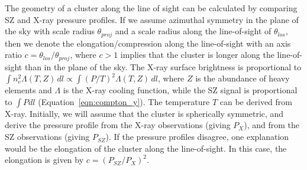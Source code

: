 \documentclass[iop,numberedappendix,apj]{emulateapj}
\begin{document}
The geometry of a cluster along the line of sight can be calculated by comparing SZ and
X-ray pressure profiles.  If we assume azimuthal symmetry in the plane of the sky with scale radius $\theta_{proj}$
and a scale radius along the line-of-sight of $\theta_{los}$, then we denote the elongation/compression 
along the line-of-sight with an axis ratio $c = \theta_{los} / \theta_{proj}$, where $c > 1$ implies that the cluster is 
longer along the line-of-sight than in the plane of the sky.
The X-ray surface brightness is proportional to $\int n_e^2 \Lambda(T,Z) \, dl \propto \int (P/T)^2 \Lambda(T,Z) \, dl$,
where $Z$ is the abundance of heavy elements and $\Lambda$ is the X-ray cooling function, 
while the SZ signal is proportional to $\int P dl$ (Equation~\ref{eqn:compton_y}).
The temperature $T$ can be derived from X-ray. Initially, we will assume that the cluster is spherically
symmetric, and derive the pressure profile from the X-ray observations (giving $P_{X}$), and from the SZ
observations (giving $P_{SZ}$). If the pressure profiles disagree, one explanation would be the elongation
of the cluster along the line-of-sight. In this case, the elongation is given by $c = (P_{SZ} / P_{X})^2$.


\end{document}
